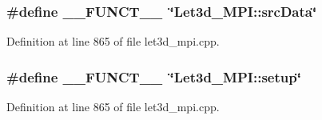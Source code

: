 \subsubsection{\setlength{\rightskip}{0pt plus 5cm}\#define \_\-\_\-FUNCT\_\-\_\-~\char`\"{}Let3d\_\-MPI::src\-Data\char`\"{}}\label{let3d__mpi_8cpp_2818853adf63a17949cf67d73c1d4473_2818853adf63a17949cf67d73c1d4473}




Definition at line 865 of file let3d\_\-mpi.cpp.
\subsubsection{\setlength{\rightskip}{0pt plus 5cm}\#define \_\-\_\-FUNCT\_\-\_\-~\char`\"{}Let3d\_\-MPI::setup\char`\"{}}\label{let3d__mpi_8cpp_2818853adf63a17949cf67d73c1d4473_2818853adf63a17949cf67d73c1d4473}




Definition at line 865 of file let3d\_\-mpi.cpp.